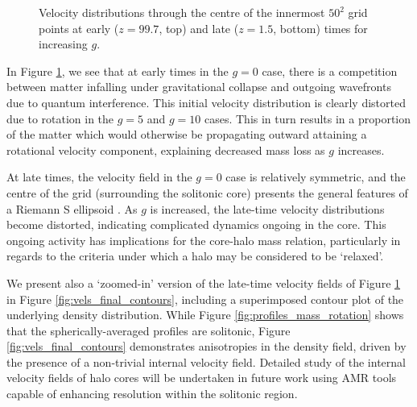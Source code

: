 \documentclass[a4paper,11pt]{article}
\begin{document}
\begin{figure}[!htb]
\endminipage\hfill
\caption{Velocity distributions through the centre of the innermost $50^2$ grid points at early ($z = 99.7$, top) and late ($z = 1.5$, bottom) times for increasing $g$.}
\label{fig:vels_initial_final}
\end{figure}

In Figure \ref{fig:vels_initial_final}, we see that at early times in the $g=0$ case, there is a competition between matter infalling under gravitational collapse and outgoing wavefronts due to quantum interference. This initial velocity distribution is clearly distorted due to rotation in the $g=5$ and $g=10$ cases. This in turn results in a proportion of the matter which would otherwise be propagating outward attaining a rotational velocity component, explaining decreased mass loss as $g$ increases. 

At late times, the velocity field in the $g=0$ case is relatively symmetric, and the centre of the grid (surrounding the solitonic core) presents the general features of a Riemann S ellipsoid \cite{Chandrasekhar1965}. As $g$ is increased, the late-time velocity distributions become distorted, indicating complicated dynamics ongoing in the core. This ongoing activity has implications for the core-halo mass relation, particularly in regards to the criteria under which a halo may be considered to be `relaxed'.

We present also a `zoomed-in' version of the late-time velocity fields of Figure \ref{fig:vels_initial_final} in Figure \ref{fig:vels_final_contours}, including a superimposed contour plot of the underlying density distribution. While Figure \ref{fig:profiles_mass_rotation} shows that the spherically-averaged profiles are solitonic, Figure \ref{fig:vels_final_contours} demonstrates anisotropies in the density field, driven by the presence of a non-trivial internal velocity field. Detailed study of the internal velocity fields of halo cores will be undertaken in future work using AMR tools capable of enhancing resolution within the solitonic region.
\end{document}
